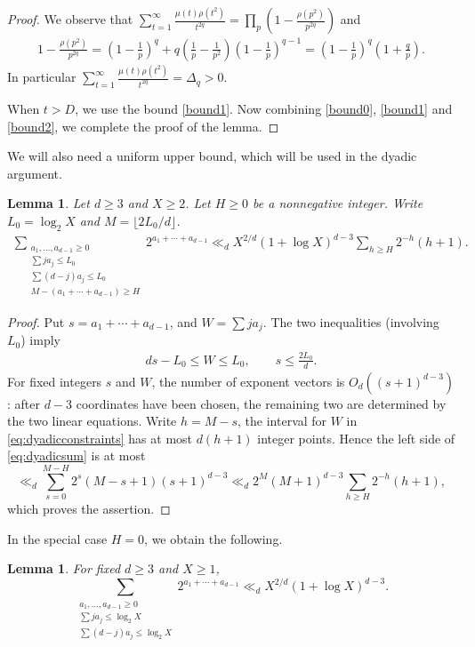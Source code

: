 \documentclass[10pt,a4paper]{amsart}
\numberwithin{equation}{section}
\newcommand{\1}{\mathbf 1}
\newtheorem{lemma}[theorem]{Lemma}
\begin{document}
\begin{proof}
We observe that $\sum_{t=1}^\infty\frac{\mu(t)\rho(t^2)}{t^{2q}}=\prod_{p}(1-\frac{\rho(p^2)}{p^{2q}})$ and 
\begin{align*} 1-\frac{\rho(p^2)}{p^{2q}}=
 \left(1-\frac1p\right)^q
 +q\left(\frac1p-\frac1{p^2}\right)
       \left(1-\frac1p\right)^{q-1}
 =\left(1-\frac1p\right)^q\left(1+\frac qp\right).
\end{align*}
In particular $\sum_{t=1}^\infty\frac{\mu(t)\rho(t^2)}{t^{2q}}=\Delta_q>0$.

When $t>D$, we use the bound \eqref{bound1}. Now combining \eqref{bound0}, \eqref{bound1} and \eqref{bound2}, we complete the proof of the lemma.
\end{proof}

We will also need a uniform upper bound, which will be used in the dyadic argument. 
\begin{lemma}\label{lem:dyadicH}
Let $d\geq3$ and $X\geq2$. Let $H\geq 0$ be a nonnegative integer. Write $L_0=\log_2X$ and $M=\lfloor2L_0/d\rfloor$.
\begin{align}
 \sum_{\substack{a_1,\ldots,a_{d-1}\geq0\\
 \sum j a_j\leq L_0\\
 \sum(d-j)a_j\leq L_0
 \\ M-(a_1+\cdots +a_{d-1})\geq H}}
 2^{a_1+\cdots+a_{d-1}}
 \ll_d X^{2/d}(1+\log X)^{d-3}
       \sum_{h\geq H}2^{-h}(h+1).
\label{eq:dyadicsum}
\end{align}
\end{lemma}

\begin{proof}
Put $s=a_1+\cdots+a_{d-1}$, and $W=\sum ja_j$.
The two inequalities (involving $L_0$) imply
\begin{align}
 d s-L_0\leq W\leq L_0,
 \qquad s\leq\frac{2L_0}{d}.
\label{eq:dyadicconstraints}
\end{align}
For fixed integers $s$ and $W$, the number of exponent vectors is
$O_d((s+1)^{d-3})$: after $d-3$ coordinates have been chosen, the
remaining two are determined by the two linear equations.  Write $h=M-s$, the interval for $W$ in
\eqref{eq:dyadicconstraints} has at most $d(h+1)$ integer points.  Hence the
left side of \eqref{eq:dyadicsum} is at most
\[
 \ll_d\sum_{s=0}^{M-H}2^s(M-s+1)(s+1)^{d-3}
 \ll_d2^M(M+1)^{d-3}
       \sum_{h\geq H}2^{-h}(h+1),
\]
which proves the assertion.
\end{proof}

In the special case $H=0$, we obtain the following.
\begin{lemma}\label{lem:dyadic}
For fixed $d\geq3$ and $X\geq 1$,
\[
 \sum_{\substack{a_1,\ldots,a_{d-1}\geq0\\
 \sum j a_j\leq\log_2X\\
 \sum(d-j)a_j\leq\log_2X}}
 2^{a_1+\cdots+a_{d-1}}
 \ll_d X^{2/d}(1+\log X)^{d-3}.
\]
\end{lemma}
\end{document}
